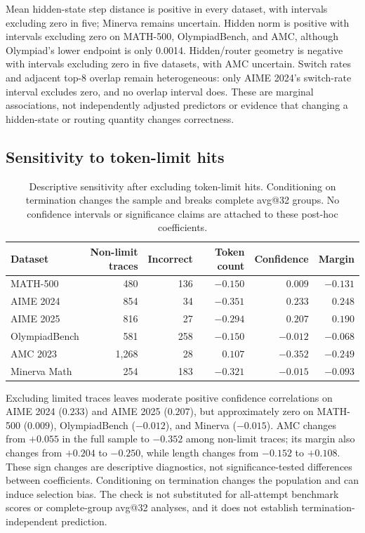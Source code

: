 Mean hidden-state step distance is positive in every dataset, with intervals
excluding zero in five; Minerva remains uncertain. Hidden norm is positive
with intervals excluding zero on MATH-500, OlympiadBench, and AMC, although
Olympiad's lower endpoint is only 0.0014. Hidden/router geometry is negative
with intervals excluding zero in five datasets, with AMC uncertain. Switch
rates and adjacent top-8 overlap remain heterogeneous: only AIME 2024's
switch-rate interval excludes zero, and no overlap interval does. These are
marginal associations, not independently adjusted predictors or evidence that
changing a hidden-state or routing quantity changes correctness.

\subsection{Sensitivity to token-limit hits}
\label{sec:qwen-corr-sensitivity}

\begin{table}[t]
\centering
\small
\caption{Descriptive sensitivity after excluding token-limit hits. Conditioning on termination changes the sample and breaks complete avg@32 groups. No confidence intervals or significance claims are attached to these post-hoc coefficients. }
\label{tab:qwen-corr-sensitivity}
\begin{tabular}{@{}lrrrrr@{}}
\toprule
Dataset & Non-limit traces & Incorrect & Token count & Confidence & Margin \\
\midrule
MATH-500 & 480 & 136 & $-0.150$ & $0.009$ & $-0.131$ \\
AIME 2024 & 854 & 34 & $-0.351$ & $0.233$ & $0.248$ \\
AIME 2025 & 816 & 27 & $-0.294$ & $0.207$ & $0.190$ \\
OlympiadBench & 581 & 258 & $-0.150$ & $-0.012$ & $-0.068$ \\
AMC 2023 & 1,268 & 28 & $0.107$ & $-0.352$ & $-0.249$ \\
Minerva Math & 254 & 183 & $-0.321$ & $-0.015$ & $-0.093$ \\
\bottomrule
\end{tabular}
\end{table}

Excluding limited traces leaves moderate positive confidence correlations on
AIME 2024 ($0.233$) and AIME 2025 ($0.207$), but approximately zero on
MATH-500 ($0.009$), OlympiadBench ($-0.012$), and Minerva ($-0.015$). AMC
changes from $+0.055$ in the full sample to $-0.352$ among non-limit traces;
its margin also changes from $+0.204$ to $-0.250$, while length changes from
$-0.152$ to $+0.108$. These sign changes are descriptive diagnostics, not
significance-tested differences between coefficients. Conditioning on
termination changes the population and can induce selection bias. The check
is not substituted for all-attempt benchmark scores or complete-group avg@32
analyses, and it does not establish termination-independent prediction.

